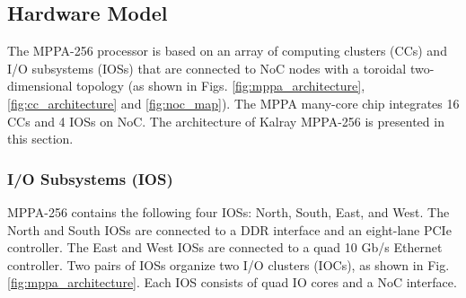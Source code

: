   \subsection{Hardware Model}
  \label{sec:hardware_model}
  The MPPA-256 processor is based on an array of computing clusters (CCs) and I/O subsystems (IOSs) that are connected to NoC nodes with a toroidal two-dimensional topology 
  (as shown in Figs. \ref{fig:mppa_architecture}, \ref{fig:cc_architecture} and \ref{fig:noc_map}).
  The MPPA many-core chip integrates 16 CCs and 4 IOSs on NoC.
  The architecture of Kalray MPPA-256 is presented in this section.
  
  \subsubsection{I/O Subsystems (IOS)}
  \label{sec:ios}
  MPPA-256 contains the following four IOSs: North, South, East, and West.
  The North and South IOSs are connected to a DDR interface and an eight-lane PCIe controller.
  The East and West IOSs are connected to a quad 10 Gb/s Ethernet controller.
  Two pairs of IOSs organize two I/O clusters (IOCs), as shown in Fig. \ref{fig:mppa_architecture}.
  Each IOS consists of quad IO cores and a NoC interface.
  
